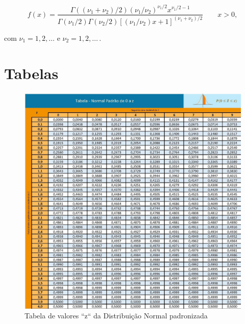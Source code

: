 \documentclass[
]{book}
\begin{document}
\hfill\break

\[
f(x) = \frac{\Gamma((\nu_{1}+\nu_{2})/2)(\nu_{1}/\nu_{2})^{\nu_{1}/2}x^{\nu_{1}/2-1}}
{\Gamma(\nu_{1}/2)\Gamma(\nu_{2}/2)[(\nu_{1}/\nu_{2})x+1]^{(\nu_{1}+\nu_{2})/2}} \qquad x > 0,
\]

com \(\nu_{1} = 1,2,\ldots\) e \(\nu_{2} = 1,2, \ldots \,\).

\hypertarget{tabelas}{%
\section{Tabelas}\label{tabelas}}

\begin{figure}

{\centering \includegraphics[width=1\linewidth]{images6/tabZ} 

}

\caption{Tabela de valores ``z`` da Distribuição Normal padronizada}\label{fig:fig30}
\end{figure}

\hfill\break
\end{document}
